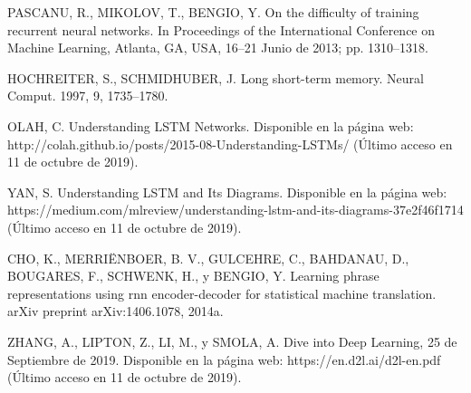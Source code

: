 \begin{thebibliography}{9}
 PASCANU, R., MIKOLOV, T., BENGIO, Y. On the difficulty of training recurrent neural networks. In Proceedings of
the International Conference on Machine Learning, Atlanta, GA, USA, 16–21 Junio de 2013; pp. 1310–1318.

 HOCHREITER, S., SCHMIDHUBER, J. Long short-term memory. Neural Comput. 1997, 9, 1735–1780.

 OLAH, C. Understanding LSTM Networks. Disponible en la p\'{a}gina web: http://colah.github.io/posts/2015-08-Understanding-LSTMs/ (\'{U}ltimo acceso en 11 de octubre de 2019).

 YAN, S. Understanding LSTM and Its Diagrams. Disponible en la p\'{a}gina web: https://medium.com/mlreview/understanding-lstm-and-its-diagrams-37e2f46f1714 (\'{U}ltimo acceso en 11 de octubre de 2019).

 CHO, K., MERRI\"{E}NBOER, B. V., GULCEHRE, C., BAHDANAU, D., BOUGARES, F., SCHWENK, H., y BENGIO, Y. Learning phrase representations using rnn encoder-decoder for statistical machine translation. arXiv preprint arXiv:1406.1078, 2014a.

 ZHANG, A., LIPTON, Z., LI, M., y SMOLA, A. Dive into Deep Learning, 25 de Septiembre de 2019. Disponible en la p\'{a}gina web: https://en.d2l.ai/d2l-en.pdf (\'{U}ltimo acceso en 11 de octubre de 2019).

\end{thebibliography} 
